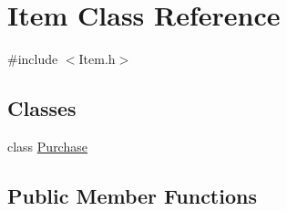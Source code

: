 \hypertarget{class_item}{}\section{Item Class Reference}
\label{class_item}


{\ttfamily \#include $<$Item.\+h$>$}

\subsection*{Classes}
\begin{DoxyCompactItemize}
\item 
class \hyperlink{class_item_1_1_purchase}{Purchase}
\end{DoxyCompactItemize}
\subsection*{Public Member Functions}
